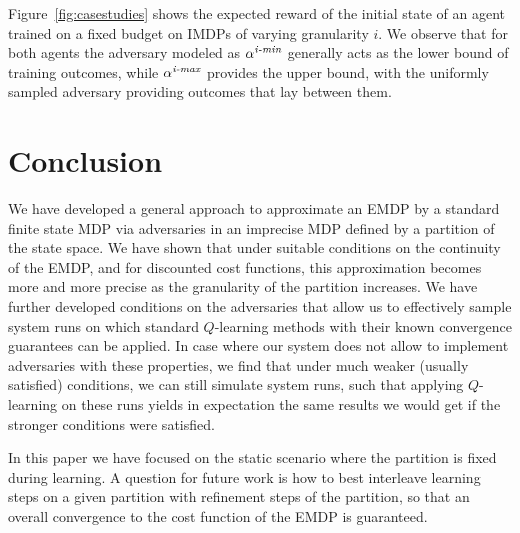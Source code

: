 \documentclass{llncs}
\begin{document}
Figure~\ref{fig:casestudies} shows the expected reward of the initial state of an agent trained on a fixed budget
on IMDPs of varying granularity $i$.
We observe that for both agents the adversary modeled as $\alpha^{\emph{i-min}}$ generally acts as 
the lower bound of training outcomes, while $\alpha^{\emph{i-max}}$ provides the upper bound, 
with the uniformly sampled adversary providing outcomes that lay between them.



\section{Conclusion}

We have developed a general approach to approximate an EMDP  by a standard finite
state MDP via adversaries in an imprecise MDP defined by a partition of the state space.
We have shown that under suitable conditions on the
continuity of the EMDP, and for discounted cost functions, this approximation becomes
more and more precise as the granularity of the partition increases. We have further developed
conditions on the adversaries that allow us to effectively sample system runs on which standard
$Q$-learning methods with their known convergence guarantees can be applied. In case where
our system does not allow to implement adversaries with these properties, we find that under
much weaker (usually satisfied) conditions, we can still simulate system runs, such that applying
$Q$-learning on these runs yields in expectation the same results we would get if the stronger
conditions were satisfied.

In this paper we have focused on the static scenario where the partition is fixed during learning.
A question for future work is how to best interleave learning steps on a given partition with
refinement steps of the partition, so that an overall convergence to the cost function of the
EMDP is guaranteed.






%
\end{document}
